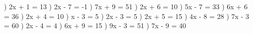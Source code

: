 \documentclass{article}%
\begin{document}
) 2x + 1 = 13%
\newline%
\newline%
) 2x - 7 = -1%
\newline%
\newline%
) 7x + 9 = 51%
\newline%
\newline%
) 2x + 6 = 10%
\newline%
\newline%
) 5x - 7 = 33%
\newline%
\newline%
) 6x + 6 = 36%
\newline%
\newline%
) 2x + 4 = 10%
\newline%
\newline%
) x - 3 = 5%
\newline%
\newline%
) 2x - 3 = 5%
\newline%
\newline%
) 2x + 5 = 15%
\newline%
\newline%
) 4x - 8 = 28%
\newline%
\newline%
) 7x - 3 = 60%
\newline%
\newline%
) 2x - 4 = 4%
\newline%
\newline%
) 6x + 9 = 15%
\newline%
\newline%
) 9x - 3 = 51%
\newline%
\newline%
) 7x - 9 = 40%
\newline%
\end{document}
